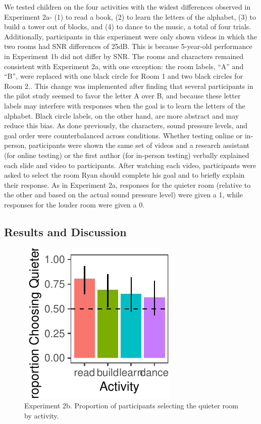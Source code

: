 \documentclass[10pt, letterpaper]{article}
\newenvironment{CodeChunk}{}{}
\begin{document}
We tested children on the four activities with the widest differences
observed in Experiment 2a- (1) to read a book, (2) to learn the letters
of the alphabet, (3) to build a tower out of blocks, and (4) to dance to
the music, a total of four trials. Additionally, participants in this
experiment were only shown videos in which the two rooms had SNR
differences of 25dB. This is because 5-year-old performance in
Experiment 1b did not differ by SNR. The rooms and characters remained
consistent with Experiment 2a, with one exception: the room labels,
``A'' and ``B'', were replaced with one black circle for Room 1 and two
black circles for Room 2.. This change was implemented after finding
that several participants in the pilot study seemed to favor the letter
A over B, and because these letter labels may interfere with responses
when the goal is to learn the letters of the alphabet. Black circle
labels, on the other hand, are more abstract and may reduce this bias.
As done previously, the characters, sound pressure levels, and goal
order were counterbalanced across conditions. Whether testing online or
in-person, participants were shown the same set of videos and a research
assistant (for online testing) or the first author (for in-person
testing) verbally explained each slide and video to participants. After
watching each video, participants were asked to select the room Ryan
should complete his goal and to briefly explain their response. As in
Experiment 2a, responses for the quieter room (relative to the other and
based on the actual sound pressure level) were given a 1, while
responses for the louder room were given a 0.

\hypertarget{results-and-discussion-3}{%
\subsection{\texorpdfstring{\textbf{Results and
Discussion}}{Results and Discussion}}\label{results-and-discussion-3}}

\begin{CodeChunk}
\begin{figure}[H]

{\centering \includegraphics{figs/unnamed-chunk-3-1} 

}

\caption[Experiment 2b]{Experiment 2b. Proportion of participants selecting the quieter room by activity.}\label{fig:unnamed-chunk-3}
\end{figure}
\end{CodeChunk}
\end{document}
